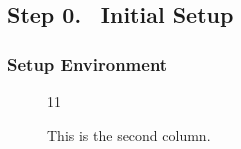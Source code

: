 \documentclass[12pt]{article}
\renewcommand{\_}{\kern-1.5pt\textunderscore\kern-1.5pt}
\begin{document}
\renewcommand\thesubsection{Step \arabic{subsection}.}
\renewcommand\thesubsubsection{\arabic{subsubsection}.}

\subsection*{Step 0. \(\;\;\)Initial Setup}

\subsubsection{Setup Environment}
\begin{figure}[ht]
	\begin{minipage}[t]{0.45\linewidth}

		11
	\end{minipage}

	\begin{minipage}[t]{0.45\linewidth}
		This is the second column.
	\end{minipage}

\end{figure}
\end{document}

